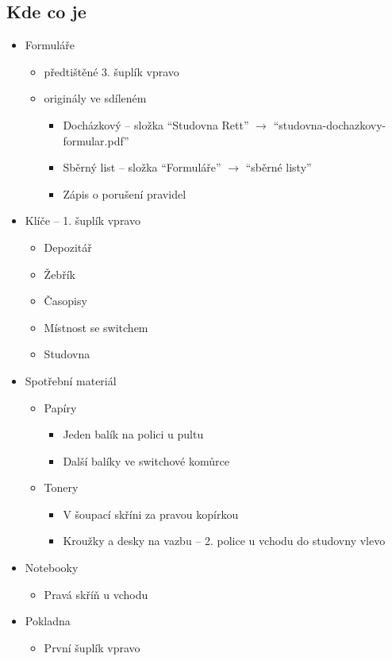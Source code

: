 \documentclass{article}
\begin{document}
\subsection{Kde co je}

\begin{itemize}
  \item Formuláře
    \begin{itemize}
      \item předtištěné 3. šuplík vpravo
      \item originály ve sdíleném
        \begin{itemize}
          \item Docházkový -- složka \enquote{Studovna Rett} $\rightarrow$ \enquote{studovna-dochazkovy-formular.pdf}
          \item Sběrný list -- složka \enquote{Formuláře} $\rightarrow$ \enquote{sběrné listy}
          \item Zápis o porušení pravidel
        \end{itemize}
    \end{itemize}
  \item Klíče -- 1. šuplík vpravo
    \begin{itemize}
      \item  Depozitář
      \item  Žebřík
      \item  Časopisy
      \item  Místnost se switchem
      \item  Studovna
    \end{itemize}
  \item Spotřební materiál
    \begin{itemize}
      \item Papíry
        \begin{itemize}
          \item  Jeden balík na polici u pultu
          \item  Další balíky ve switchové komůrce
        \end{itemize}
      \item  Tonery
        \begin{itemize}
          \item  V šoupací skříni za pravou kopírkou
          \item  Kroužky a desky na vazbu -- 2. police u vchodu do studovny vlevo
        \end{itemize}
    \end{itemize}
      \item Notebooky
        \begin{itemize}
      \item Pravá skříň u vchodu
    \end{itemize}
      \item Pokladna
        \begin{itemize}
          \item První šuplík vpravo
        \end{itemize}
    \end{itemize}
\end{document}
